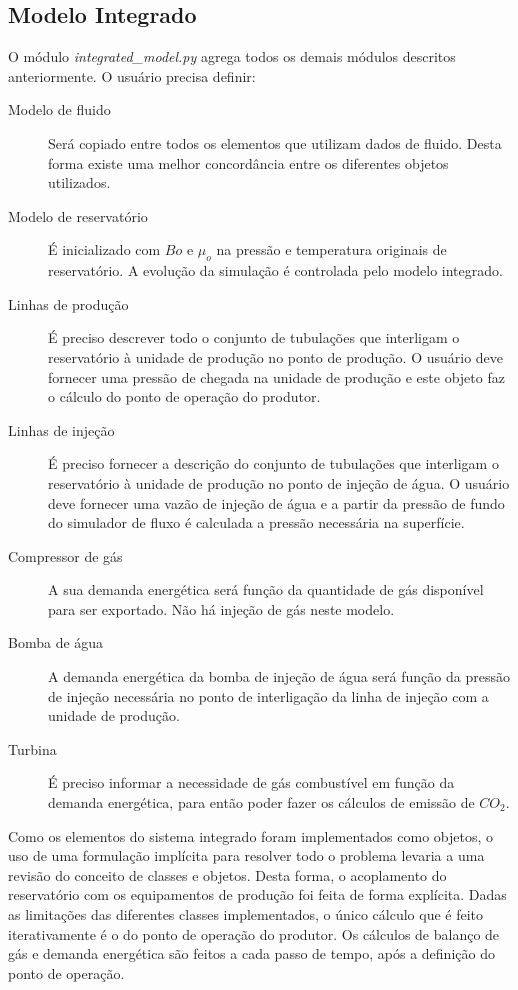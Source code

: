 \documentclass[final,5p]{elsarticle}
\numberwithin{equation}{section}
\begin{document}
    \subsection{Modelo Integrado}

        O módulo \emph{integrated\_model.py} agrega todos os demais módulos descritos anteriormente. O usuário precisa definir:

        \begin{description}
            \item[Modelo de fluido] Será copiado entre todos os elementos que utilizam dados de fluido. Desta forma existe uma melhor concordância entre os diferentes objetos utilizados.
            \item[Modelo de reservatório] É inicializado com $Bo$ e $\mu_o$ na pressão e temperatura originais de reservatório. A evolução da simulação é controlada pelo modelo integrado.
            \item[Linhas de produção] É preciso descrever todo o conjunto de tubulações que interligam o reservatório à unidade de produção no ponto de produção. O usuário deve fornecer uma pressão de chegada na unidade de produção e este objeto faz o cálculo do ponto de operação do produtor.
            \item[Linhas de injeção] É preciso fornecer a descrição do conjunto de tubulações que interligam o reservatório à unidade de produção no ponto de injeção de água. O usuário deve fornecer uma vazão de injeção de água e a partir da pressão de fundo do simulador de fluxo é calculada a pressão necessária na superfície.
            \item[Compressor de gás] A sua demanda energética será função da quantidade de gás disponível para ser exportado. Não há injeção de gás neste modelo.
            \item[Bomba de água] A demanda energética da bomba de injeção de água será função da pressão de injeção necessária no ponto de interligação da linha de injeção com a unidade de produção.
            \item[Turbina] É preciso informar a necessidade de gás combustível em função da demanda energética, para então poder fazer os cálculos de emissão de $CO_2$.
        \end{description}

        Como os elementos do sistema integrado foram implementados como objetos, o uso de uma formulação implícita para resolver todo o problema levaria a uma revisão do conceito de classes e objetos. Desta forma, o acoplamento do reservatório com os equipamentos de produção foi feita de forma explícita. Dadas as limitações das diferentes classes implementados, o único cálculo que é feito iterativamente é o do ponto de operação do produtor. Os cálculos de balanço de gás e demanda energética são feitos a cada passo de tempo, após a definição do ponto de operação.
\end{document}

